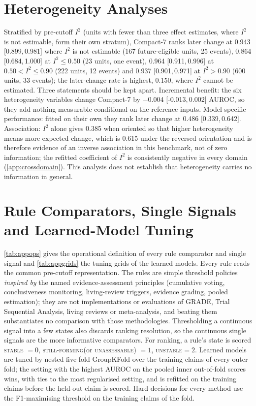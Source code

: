 \documentclass[11pt]{article}
\newcommand{\compact}{Compact-7\xspace}
\newcommand{\stable}{\textsc{stable}\xspace}
\newcommand{\forming}{\textsc{still-forming}\xspace}
\newcommand{\unstable}{\textsc{unstable}\xspace}
\newcommand{\unassess}{\textsc{unassessable}\xspace}
\newcommand{\ci}[2]{[#1,\,#2]}
\begin{document}
\section{Heterogeneity Analyses}
\label{app:hetero}
Stratified by pre-cutoff $I^2$ (units with fewer than three effect estimates, where $I^2$ is not
estimable, form their own stratum), \compact ranks later change at 0.943 \ci{0.899}{0.981} where
$I^2$ is not estimable (167 future-eligible units, 25 events), 0.864 \ci{0.684}{1.000} at $I^2\le0.50$
(23 units, one event), 0.964 \ci{0.911}{0.996} at $0.50<I^2\le0.90$ (222 units, 12 events) and
0.937 \ci{0.901}{0.971} at $I^2>0.90$ (600 units, 33 events); the later-change rate is highest,
0.150, where $I^2$ cannot be estimated. Three
statements should be kept apart. Incremental benefit: the six heterogeneity variables change
\compact by $-0.004$ \ci{-0.013}{0.002} AUROC, so they add nothing measurable conditional on the
reference inputs. Model-specific performance: fitted on their own they rank later change at 0.486
\ci{0.339}{0.642}. Association: $I^2$ alone gives 0.385 when oriented so that higher heterogeneity
means more expected change, which is 0.615 under the reversed orientation and is therefore
evidence of an inverse association in this benchmark, not of zero information; the refitted
coefficient of $I^2$ is consistently negative in every domain (\cref{app:crossdomain}).
This analysis does not establish that heterogeneity carries no information in general.

\section{Rule Comparators, Single Signals and Learned-Model Tuning}
\label{app:comparators}
\cref{tab:appops} gives the operational definition of every rule comparator and single signal
and \cref{tab:appgrids} the tuning grids of the learned models. Every rule reads the common
pre-cutoff representation. The rules are simple threshold policies \emph{inspired by} the named
evidence-assessment principles (cumulative voting, conclusiveness monitoring, living-review
triggers, evidence grading, pooled estimation); they are not implementations or evaluations of
GRADE, Trial Sequential Analysis, living reviews or meta-analysis, and beating them substantiates
no comparison with those methodologies. Thresholding a continuous signal into a few states also
discards ranking resolution, so the continuous single signals are the more informative
comparators. For ranking, a rule's state is scored \stable
$=0$, \forming (or \unassess) $=1$, \unstable $=2$. Learned models are tuned by nested five-fold
GroupKFold over the training claims of every outer fold; the setting with the highest AUROC on the
pooled inner out-of-fold scores wins, with ties to the most regularised setting, and is refitted on
the training claims before the held-out claim is scored. Hard decisions for every method use the
F1-maximising threshold on the training claims of the fold.
\end{document}
